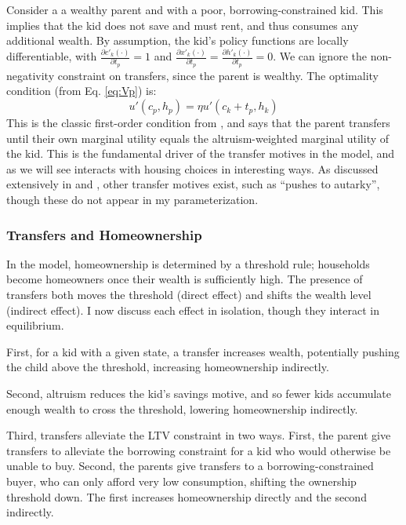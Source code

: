 \documentclass[12pt]{article}
\begin{document}
Consider a a wealthy parent and with a poor, borrowing-constrained kid. This implies that the kid does not save and must rent, and thus consumes any additional wealth. By assumption, the kid's policy functions are locally differentiable, with $\frac{\partial c'_k(\cdot)}{\partial t_p}=1$ and $\frac{\partial x'_k(\cdot)}{\partial t_p}=\frac{\partial h'_k(\cdot)}{\partial t_p}=0$. We can ignore the non-negativity constraint on transfers, since the parent is wealthy. The optimality condition (from Eq. \ref{eq:Vp}) is:
\begin{equation}\label{eq:FOC}
	u'(c_p,h_p) = \eta u'(c_k + t_p,h_k)
\end{equation}
This is the classic first-order condition from \cite{Altonji1997a}, and says that the parent transfers until their own marginal utility equals the altruism-weighted marginal utility of the kid. This is the fundamental driver of the transfer motives in the model, and as we will see interacts with housing choices in interesting ways. As discussed extensively in \cite{Barczyk2020a} and \cite{Chu2020}, other transfer motives exist, such as ``pushes to autarky'', though these do not appear in my parameterization.

\subsubsection{Transfers and Homeownership}
In the model, homeownership is determined by a threshold rule; households become homeowners once their wealth is sufficiently high. The presence of transfers both moves the threshold (direct effect) and shifts the wealth level (indirect effect). I now discuss each effect in isolation, though they interact in equilibrium.

First, for a kid with a given state, a transfer increases wealth, potentially pushing the child above the threshold, increasing homeownership indirectly.

Second, altruism reduces the kid's savings motive, and so fewer kids accumulate enough wealth to cross the threshold, lowering homeownership indirectly.

Third, transfers alleviate the LTV constraint in two ways. First, the parent give transfers to alleviate the borrowing constraint for a kid who would otherwise be unable to buy. Second, the parents give transfers to a borrowing-constrained buyer, who can only afford very low consumption, shifting the ownership threshold down. The first increases homeownership directly and the second indirectly.
\end{document}
